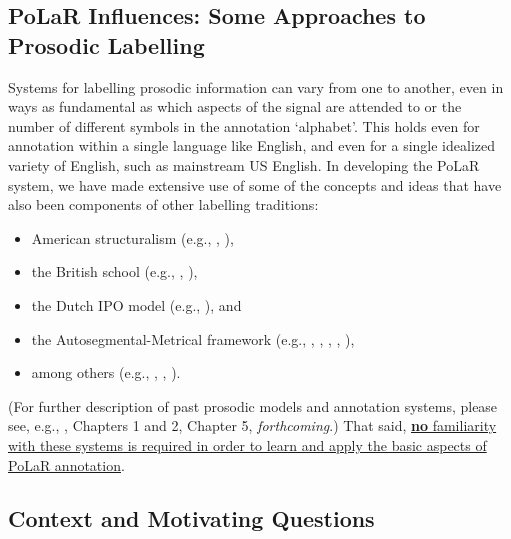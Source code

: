 \subsection{PoLaR Influences: Some Approaches to Prosodic Labelling}\label{sec:past-approaches-to-prosodic-labelling}

Systems for labelling prosodic information can vary from one to another, even in ways as fundamental as which aspects of the signal are attended to or the number of different symbols in the annotation ‘alphabet’. This holds even for annotation within a single language like English, and even for a single idealized variety of English, such as mainstream US English. In developing the PoLaR system, we have made extensive use of some of the concepts and ideas that have also been components of other labelling traditions:

\begin{itemize}
\item American structuralism (e.g., \citealt{pike45}, \citealt{tragersmith51}),
\item the British school (e.g., \citealt{crystal69}, \citealt{oconnorarnold73}),
\item the Dutch IPO model (e.g., \citealt{t-hart-90}), and
\item the Autosegmental-Metrical framework (e.g., \citealt{pierrehumbert80}, \citealt{beckmanayers97}, \citealt{grabe-01}, \citealt{hualdeprieto16}, \citealt{dilleybreen18}),
\item among others (e.g., \citealt{hirst07}, \citealt{taylor98}, \citealt{xu12}).
\end{itemize}

(For further description of past prosodic models and annotation systems, please see, e.g., \citealt{roach94}, \citealt{ladd08} Chapters 1 and 2, \citealt{fery17} Chapter 5, \citeauthor{barnesshattuckhufnagel20} \textit{forthcoming}.) That said, \uline{\textbf{no} familiarity with these systems is required in order to learn and apply the basic aspects of PoLaR annotation}.

\subsection{Context and Motivating Questions}\label{sec:context-and-motivating-questions}

